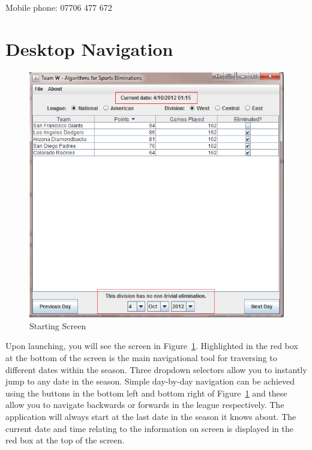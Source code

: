 Mobile phone: 07706 477 672

\section{Desktop Navigation}

\begin{figure}
  \includegraphics[width=\linewidth,keepaspectratio]{images/userManualDesk1.png}
  \caption{Starting Screen}\label{fig:STARTSCREEN}
\end{figure}
Upon launching, you will see the screen in Figure~\ref{fig:STARTSCREEN}.
Highlighted in the red box at the bottom of the screen is the
main navigational tool for traversing to different dates within the
season. Three dropdown selectors allow you to instantly jump to any
date in the season. Simple day-by-day navigation can be achieved
using the buttons in the bottom left and bottom right of
Figure~\ref{fig:STARTSCREEN} and these allow you to navigate backwards
or forwards in the league respectively.
The application will always start at the last date in the season it
knows about. The current date and time relating to the information on
screen is displayed in the red box at the top of the screen.

